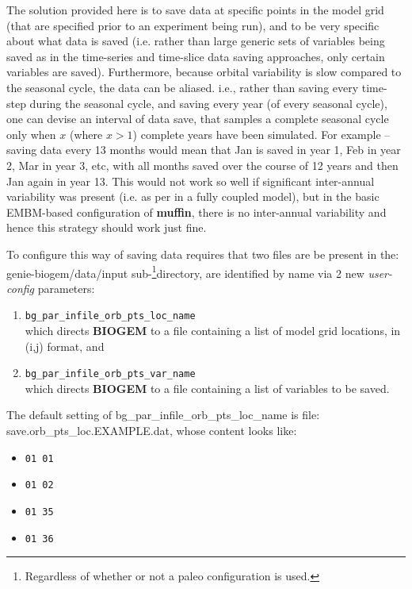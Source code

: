 The solution provided here is to save data at specific points in the model grid (that are specified prior to an experiment being run), and to be very specific about what data is saved (i.e. rather than large generic sets of variables being saved as in the time-series and time-slice data saving approaches, only certain variables are saved). Furthermore, because orbital variability is slow compared to the seasonal cycle, the data can be aliased. i.e., rather than saving every time-step during the seasonal cycle, and saving every year (of every seasonal cycle), one can devise an interval of data save, that samples a complete seasonal cycle only when \(x\) (where \(x>1\)) complete years have been simulated. For example -- saving data every 13 months would mean that Jan is saved in year 1, Feb in year 2, Mar in year 3, etc, with all months saved over the course of 12 years and then Jan again in year 13. This would not work so well if significant inter-annual variability was present (i.e. as per in a fully coupled model), but in the basic EMBM-based configuration of \textbf{muffin}, there is no inter-annual variability and hence this strategy should work just fine.

To configure this way of saving data requires that two files are be present in the: \\ \footnotesize\textsf{genie-biogem/data/input }\normalsize sub-\footnote{Regardless of whether or not a paleo configuration is used.}directory, are identified by name via 2 new \textit{user-config} parameters:

\vspace{2mm}
\begin{enumerate}[noitemsep]
\item \texttt{bg\_par\_infile\_orb\_pts\_loc\_name}
\\which directs \textbf{BIOGEM} to a file containing a list of model grid locations, in (i,j) format, and
\item \texttt{bg\_par\_infile\_orb\_pts\_var\_name}
\\which directs \textbf{BIOGEM} to a file containing a list of variables to be saved.
\end{enumerate}
\vspace{1mm}

The default setting of  \footnotesize\textsf{bg\_par\_infile\_orb\_pts\_loc\_name }\normalsize  is file:  \footnotesize\textsf{save.orb\_pts\_loc.EXAMPLE.dat}\normalsize, whose content looks like:
\vspace{1mm}
\begin{itemize}[noitemsep]
\item[] \texttt{01 01}
\item[] \texttt{01 02}
\item[] \texttt{01 35}
\item[] \texttt{01 36}
\end{itemize}
\vspace{1mm}

